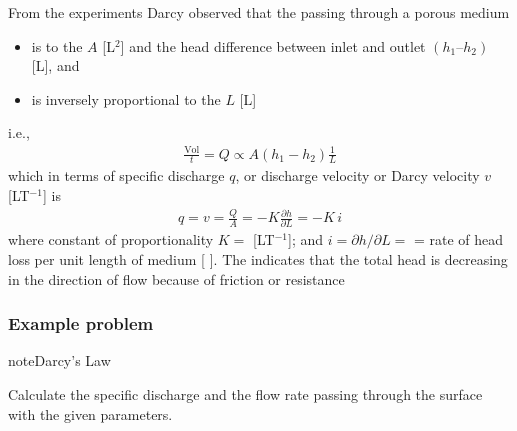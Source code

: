 \documentclass[letterpaper,10pt,english]{sphinxmanual}
\begin{document}
From the experiments Darcy observed that the  passing through a porous medium
\begin{itemize}
\item {} 
is  to the  \(A\) {[}L\(^2\){]} and the head difference between inlet and outlet \((h_1 – h_2)\) {[}L{]}, and

\item {} 
is inversely proportional to the  \(L\) {[}L{]}

\end{itemize}

i.e.,
\begin{equation*}
\begin{split}
\frac{\text{Vol}}{t}= Q \propto A (h_1 - h_2)\frac{1}{L}
\end{split}
\end{equation*}
which in terms of specific discharge \(q\), or discharge velocity or Darcy velocity \(v\) {[}LT\(^{-1}\){]} is
\begin{equation*}
\begin{split}
q = v = \frac{Q}{A}= - K\frac{\partial h}{\partial L} = - K\,i
\end{split}
\end{equation*}
where constant of proportionality \(K =\)  {[}LT\(^{-1}\){]}; and \(i = \partial h/ \partial L =\)
 = rate of head loss per unit length of medium {[} {]}. The 
indicates that the total head is decreasing in the direction of flow because of friction or
resistance


\subsubsection{Example problem}
\label{\detokenize{contents/flow/lecture_04/14_darcy_law_K:id1}}
\begin{sphinxadmonition}{note}{Darcy’s Law}

Calculate the specific discharge and the flow rate passing through the surface with the given parameters.
\end{sphinxadmonition}
\end{document}
